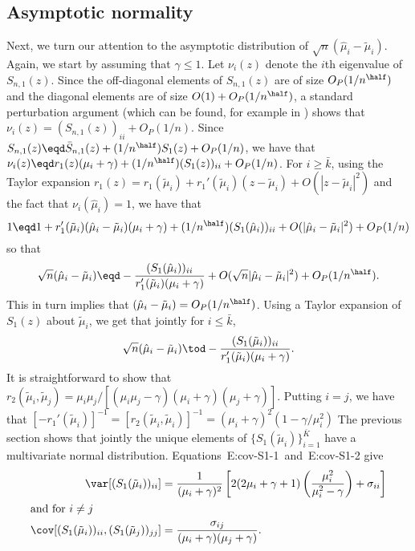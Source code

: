 \subsection{Asymptotic normality}

Next, we turn our attention to the asymptotic distribution of 
$\sqrt{n} (\hat \mu_i - \tilde \mu_i)$.  Again, we start by assuming that $\gamma \leq 1$.  Let $\nu_i(z)$ denote the $i$th
eigenvalue of $S_{n,1}(z)$.  Since the off-diagonal elements of $S_{n,1}(z)$ are
of size $O_P(1/n^\half)$ and the diagonal elements are of size
$O(1) + O_P(1/n^\half)$, a standard perturbation argument
(which can be found, for example in \cite{anderson1963atp}) shows that
$\nu_i(z) = (S_{n,1}(z))_{ii} + O_P(1/n)$.
Since $S_{n,1}(z) \eqd \bar S_{n,1}(z) + (1/n^\half) S_1(z) + O_P(1/n)$, we
have that 
$\nu_i(z) \eqd r_1(z) (\mu_i + \gamma) + (1/n^\half) (S_1(z))_{ii} + O_P(1/n)$.
For $i \geq \bar k$, using the Taylor expansion 
$r_1(z) = r_1 (\tilde \mu_i) + r_1'(\tilde \mu_i) (z - \tilde \mu_i) + O(|z - \tilde \mu_i|^2)$
and the fact that $\nu_i (\hat \mu_i) = 1$, we have that
\[
    1 \eqd 1 
            + r_1' (\tilde \mu_i)(\hat \mu_i - \tilde \mu_i)(\mu_i + \gamma) 
            + (1/n^\half) (S_1(\hat \mu_i))_{ii}
            + O(|\hat \mu_i - \tilde \mu_i|^2) 
            + O_P(1/n)
\]
so that
\[
    \sqrt{n} (\hat \mu_i - \tilde \mu_i)
    \eqd
        -\frac{(S_1(\hat \mu_i))_{ii}}
              {r_1' (\tilde \mu_i) (\mu_i + \gamma)}
        + O(\sqrt{n}|\hat \mu_i - \tilde \mu_i|^2)       
        + O_P(1/n^\half).
\]
This in turn implies that $(\hat \mu_i - \tilde \mu_i) = O_P(1/n^\half)$.
Using a Taylor expansion of $S_1(z)$ about $\tilde \mu_i$, we get that jointly
for $i \leq \bar k$,
\[
    \sqrt{n} (\hat \mu_i - \tilde \mu_i)
        \tod -\frac{(S_1(\tilde \mu_i))_{ii}}
                   {r_1' (\tilde \mu_i) (\mu_i + \gamma)}.
\]
It is straightforward to show that 
\(
    r_2(\tilde \mu_i, \tilde \mu_j) 
    =
    \mu_i \mu_j 
    / 
    [ (\mu_i \mu_j - \gamma) (\mu_i + \gamma) (\mu_j + \gamma) ].
\)
Putting $i = j$, we have that
\(
    \left[ -r_1'(\tilde \mu_i ) \right]^{-1}
    =
    \left[ r_2(\tilde \mu_i, \tilde \mu_i) \right]^{-1}
    =
    \left( \mu_i + \gamma \right)^2
    \left( 1 - \gamma/\mu_i^2 \right)
\)
The previous section shows that jointly the unique elements
of $\{ S_1(\tilde \mu_i) \}_{i=1}^{\bar K}$ have a multivariate normal distribution.
Equations~{E:cov-S1-1}~and~{E:cov-S1-2} give
\begin{align*}
    \var [ (S_1(\tilde \mu_i))_{ii} ]
        &= \frac{1}{(\mu_i + \gamma)^2}
           \left[
               2 ( 2 \mu_i + \gamma + 1 )
               \left(
                   \frac{\mu_i^2}{\mu_i^2 - \gamma}
               \right)
               +
               \sigma_{ii}
           \right] \\
\intertext{and for $i \neq j$}
    \cov [ (S_1(\tilde \mu_i))_{ii},  (S_1(\tilde \mu_j))_{jj}]
        &= \frac{\sigma_{ij}}
                {(\mu_i + \gamma)(\mu_j + \gamma)}.
\end{align*}
